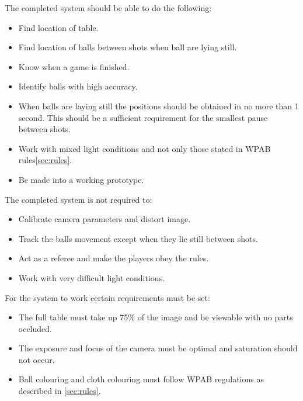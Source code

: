 The completed system should be able to do the following:

\begin{itemize}
\setlength{\itemsep}{0mm}
	\item Find location of table.
	\item Find location of balls between shots when ball are lying still.
	\item Know when a game is finished.
	\item Identify balls with high accuracy.
	\item When balls are laying still the positions should be obtained in no more than 1 second. This should be a sufficient requirement for the smallest pause between shots.
	\item Work with mixed light conditions and not only those stated in WPAB rules\ref{sec:rules}.
	\item Be made into a working prototype.
\end{itemize}

The completed system is not required to:

\begin{itemize}
\setlength{\itemsep}{0mm}
	\item Calibrate camera parameters and distort image.
	\item Track the balls movement except when they lie still between shots.
	\item Act as a referee and make the players obey the rules.
	\item Work with very difficult light conditions.
\end{itemize}
For the system to work certain requirements must be set:

\begin{itemize}
\setlength{\itemsep}{0mm}
	\item The full table must take up 75\% of the image and  be viewable with no parts occluded.
	\item The exposure and focus of the camera must be optimal and saturation should not occur.
	\item Ball colouring and cloth colouring must follow WPAB regulations as described in \ref{sec:rules}.
\end{itemize}